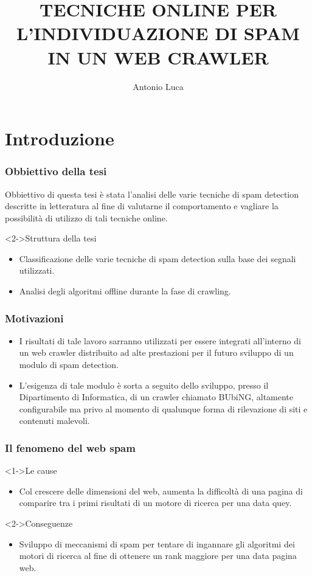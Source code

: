 \documentclass{beamer}
\title[Tesi di Laurea]{TECNICHE ONLINE PER L’INDIVIDUAZIONE DI SPAM IN UN WEB CRAWLER}
\institute{Università degli Studi di Milano}
\author{Antonio Luca}
\begin{document}
\begin{frame}
  \maketitle
\end{frame}

\section{Introduzione}
\begin{frame}
  \frametitle{Obbiettivo della tesi}  
  Obbiettivo di questa tesi è stata l’analisi delle varie tecniche di spam detection descritte in letteratura al fine di valutarne il comportamento e vagliare la possibilità di utilizzo di tali tecniche online.

  \begin{block}<2->{Struttura della tesi}
  \begin{itemize}
  \item Classificazione delle varie tecniche di spam detection sulla base dei segnali utilizzati.
  \item Analisi degli algoritmi offline durante la fase di crawling.
  \end{itemize}
  \end{block}
\end{frame}
\begin{frame}
  \frametitle{Motivazioni}  
  \begin{itemize}
\item I risultati di tale lavoro sarranno utilizzati per essere integrati all’interno di un web crawler distribuito ad alte prestazioni per il futuro sviluppo di un modulo di spam detection.
\item L’esigenza di tale modulo è sorta a seguito dello sviluppo, presso il Dipartimento di Informatica, di un crawler chiamato BUbiNG, altamente configurabile ma
privo al momento di qualunque forma di rilevazione di siti e contenuti malevoli.
  \end{itemize}
\end{frame}
\begin{frame}
    \frametitle{Il fenomeno del web spam}
    \begin{block}<1->{Le cause}
    \begin{itemize}
    \item<1->Col crescere delle dimensioni del web, aumenta la difficoltà di una pagina di comparire tra i primi risultati di un motore di ricerca per una data quey.
    \end{itemize}
    \end{block}
    \begin{block}<2->{Conseguenze}
    \begin{itemize}
        \item<1->Sviluppo di meccanismi di spam per tentare di ingannare gli algoritmi dei motori di ricerca al fine di ottenere un rank maggiore per una data pagina web. 
    \end{itemize}
    \end{block}
\end{frame}
\end{document}
